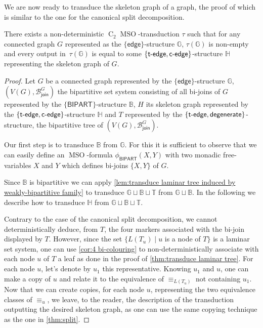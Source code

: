 \documentclass{lmcs} %
\newcommand{\MSO}{\ensuremath{\operatorname{MSO}}\xspace}
\newcommand{\CMSO}[1][]{\ensuremath{\C[#1]{\!\!}\MSO}\xspace}
\newcommand{\C}[1][]{\ensuremath{\operatorname{C}_{#1}}\xspace}
\newcommand{\edge}{\ensuremath{\mathsf{edge}}\xspace}
\newcommand{\tedge}{\ensuremath{\mathsf{t}\text-\mathsf{edge}}\xspace}
\newcommand{\cedge}{\ensuremath{\mathsf{c}\text-\mathsf{edge}}\xspace}
\newcommand{\BIPARTITION}{\ensuremath{\mathsf{BIPART}}\xspace}
\newcommand{\joinSet}{\ensuremath{\mathcal{B}_\mathsf{join}^G}}
\newcommand\DEGENERATE{\ensuremath{\mathsf{degenerate}}\xspace}
\begin{document}
We are now ready to transduce the skeleton graph of a graph, the proof of which is similar to the one for the canonical split decomposition.
\begin{thm}\label{thm:bi-join1}
    There exists a non-deterministic \CMSO[2]-transduction $\tau$
    such that for any connected graph $G$ represented as the $\{\edge\}$-structure $\mathbb{G}$,
    $\tau(\mathbb{G})$ is non-empty
    and every output in~$\tau(\mathbb{G})$
    is equal to some $\{\tedge,\cedge\}$-structure $\mathbb{H}$ representing the skeleton graph of $G$.
\end{thm}
\begin{proof}
    Let $G$ be a connected graph represented by the $\{\edge\}$-structure $\mathbb{G}$, $(V(G), \joinSet)$ the bipartitive set system consisting of all bi-joins
    of $G$ represented by the $\{\BIPARTITION\}$-structure $\mathbb{B}$, $H$ its skeleton graph represented by the $\{\tedge,\cedge\}$-structure $\mathbb{H}$ and $T$ represented by the $\{\tedge,\DEGENERATE\}$-structure, the bipartitive tree of $(V(G),\joinSet)$.

    Our first step is to transduce $\mathbb{B}$ from $\mathbb{G}$. For this it is sufficient to observe that we can easily define an \MSO-formula $\phi_{\BIPARTITION}(X,Y)$ with two monadic free-variables $X$ and $Y$ which defines bi-joins $\{X,Y\}$ of $G$.

    Since $\mathbb{B}$ is bipartitive we can apply \autoref{lem:transduce laminar tree induced by weakly-bipartitive family} to transduce $\mathbb{G}\sqcup \mathbb{B}\sqcup \mathbb{T}$ from $\mathbb{G}\sqcup \mathbb{B}$. In the following we describe how to transduce $\mathbb{H}$ from $\mathbb{G}\sqcup \mathbb{B}\sqcup \mathbb{T}$.

    Contrary to the case of the canonical split decomposition, we cannot deterministically deduce, from $T$, the four markers associated with the bi-join displayed by
    $T$. However, since the set $\{L(T_u)\mid u$ is a node of $T\}$ is a laminar set system, one can use \autoref{cor:4 bi-colouring} to
    non-deterministically associate with each node $u$ of $T$ a leaf as done in the proof of \autoref{thm:transduce laminar tree}. For each node $u$, let's denote
    by $u_1$ this representative. Knowing $u_1$ and $u$, one can make a copy of $u$ and relate it to the equivalence of $\equiv_{L(T_u)}$ not containing
    $u_1$. Now that we can create copies, for each node $u$, representing the two equivalence classes of $\equiv_u$, we leave, to the reader, the description of the
    transduction outputting the desired skeleton graph, as one can use the same copying technique as the one in \autoref{thm:split}.
\end{proof}
\end{document}
